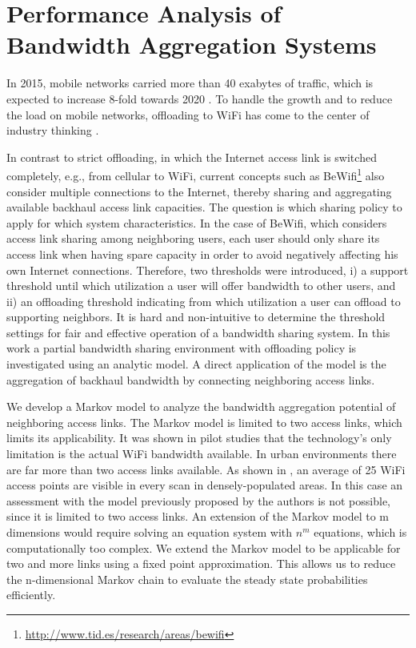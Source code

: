 \chapter{Performance Analysis of Bandwidth Aggregation Systems}\label{chap:aggregation}

In 2015, mobile networks carried more than 40 exabytes of traffic, which is expected to increase 8-fold towards 2020 \cite{cisco2016mobile}.
To handle the growth and to reduce the load on mobile networks, offloading to WiFi has come to the center of industry thinking \cite{wba2011wifi}.

In contrast to strict offloading, in which the Internet access link is switched completely, e.g., from cellular to WiFi, current concepts such as BeWifi\footnote{\url{http://www.tid.es/research/areas/bewifi}} also consider multiple connections to the Internet, thereby sharing and aggregating available backhaul access link capacities. The question is which sharing policy to apply for which system characteristics. In the case of BeWifi, which considers access link sharing among neighboring users, each user should only share its access link when having spare capacity in order to avoid negatively affecting his own Internet connections. Therefore, two thresholds were introduced, i) a support threshold until which utilization a user will offer bandwidth to other users, and ii) an offloading threshold indicating from which utilization a user can offload to supporting neighbors.
It is hard and non-intuitive to determine the threshold settings for fair and effective operation of a bandwidth sharing system.
In this work a partial bandwidth sharing environment with offloading policy is investigated using an analytic model.
A direct application of the model is the aggregation of backhaul bandwidth by connecting neighboring access links.

We develop a Markov model to analyze the bandwidth aggregation potential of neighboring access links.
The Markov model is limited to two access links, which limits its applicability.
It was shown in pilot studies that the technology's only limitation is the actual WiFi bandwidth available.
In urban environments there are far more than two access links available.
As shown in \cite{sapiezynski2015tracking}, an average of 25 WiFi access points are visible in every scan in densely-populated areas.
In this case an assessment with the model previously proposed by the authors is not possible, since it is limited to two access links.
An extension of the Markov model to m dimensions would require solving an equation system with $n^m$ equations, which is computationally too complex.
We extend the Markov model to be applicable for two and more links using a fixed point approximation.
This allows us to reduce the n-dimensional Markov chain to evaluate the steady state probabilities efficiently.

